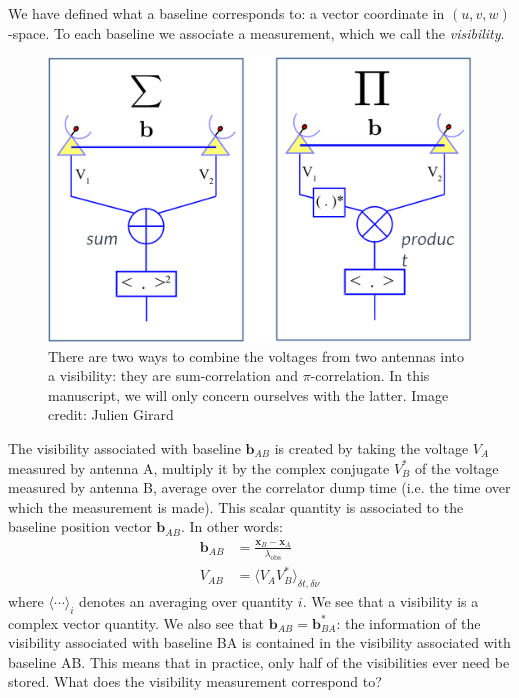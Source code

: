 \pg
We have defined what a baseline corresponds to: a vector coordinate in $(u,v,w)$-space. To each baseline we associate a measurement, which we call the \emph{visibility}. 
\begin{figure}[ht]
\centering
\includegraphics[width=.7\textwidth]{images/visibility-creation.png}
\caption{\label{fig.visibility} There are two ways to combine the voltages from two antennas into a visibility: they are sum-correlation and $\pi$-correlation. In this manuscript, we will only concern ourselves with the latter. Image credit: Julien Girard}
\end{figure}
The visibility associated with baseline $\mathbf{b}_{AB}$ is created by taking the voltage $V_A$ measured by antenna A, multiply it by the complex conjugate $V_B^*$ of the voltage measured by antenna B, average over the correlator dump time (i.e. the time over which the measurement is made). This scalar quantity is associated to the baseline position vector $\mathbf{b}_{AB}$. In other words:
\begin{align}
\mathbf{b}_{AB} &= \frac{\mathbf{x}_{B}-\mathbf{x}_{A}}{\lambda_\mathrm{obs}}\\
V_{AB}          &= \langle V_{A} V_{B}^*\rangle_{\delta t, \delta \nu} 
\end{align}
where $\langle \cdots \rangle_{i}$ denotes an averaging over quantity $i$. We see that a visibility is a complex vector quantity. We also see that $\mathbf{b}_{AB} = \mathbf{b}_{BA}^*$: the information of the visibility associated with baseline BA is contained in the visibility associated with baseline AB. This means that in practice, only half of the visibilities ever need be stored. What does the visibility measurement correspond to?
